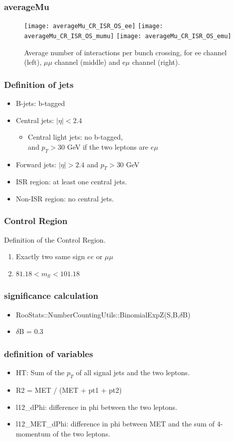 \documentclass[mathserif,serif]{beamer}
\begin{document}
\begin{frame}
\frametitle{averageMu}
\begin{figure}
\texttt{[image: averageMu\_CR\_ISR\_OS\_ee]}
\texttt{[image: averageMu\_CR\_ISR\_OS\_mumu]}
\texttt{[image: averageMu\_CR\_ISR\_OS\_emu]} \\
\caption{Average number of interactions per bunch crossing, for ee channel (left), $\mu\mu$ channel (middle) and e$\mu$ channel (right).}
\end{figure}
\end{frame}

\begin{frame}
\frametitle{Definition of jets}
\normalsize
\begin{itemize}
\item B-jets: b-tagged
\item Central jets: $|\eta|<2.4$
\begin{itemize}
\item Central light jets: no b-tagged,\\
and $p_T>30$ GeV if the two leptons are $e\mu$
\end{itemize}
\item Forward jets: $|\eta|>2.4$ and $p_T>30$ GeV
\item ISR region: at least one central jets.
\item Non-ISR region: no central jets.
\end{itemize}
\end{frame}

\begin{frame}
\frametitle{Control Region}
Definition of the Control Region.
\begin{enumerate}
\item Exactly two same sign $ee$ or $\mu\mu$
\item $81.18 < m_{ll} < 101.18$
\end{enumerate}
\end{frame}

\begin{frame}
\frametitle{significance calculation}
\begin{itemize}
\item RooStats::NumberCountingUtils::BinomialExpZ(S,B,$\delta$B)
\item $\delta$B = 0.3
\end{itemize}
\end{frame}

\begin{frame}
\frametitle{definition of variables}
\normalsize
\begin{itemize}
\item HT: Sum of the $p_T$ of all signal jets and the two leptons.
\item R2 = MET / (MET + pt1 + pt2)
\item l12\_dPhi: difference in phi between the two leptons.
\item l12\_MET\_dPhi: difference in phi between MET and the sum of 4-momentum of the two leptons.
\end{itemize}
\end{frame}
\end{document}
